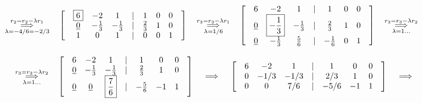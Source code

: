 \documentclass[fleqn]{article}
\begin{document}
\[
\overset{r_2=r_2-\lambda r_1}{\underset{\lambda=-4/6=-2/3}{\implies}} \hspace{0.321cm}
\begin{bmatrix}
& \boxed{6} & -2 & 1 & | & 1 & 0 & 0 & \\
& \underline{0} & -\frac{1}{3} & -\frac{1}{3} & | & \frac{2}{3} & 1 & 0 & \\
& 1 & 0 & 1 & | & 0 & 0 & 1 & 
\end{bmatrix}
\hspace{0.321cm} \overset{r_3=r_3-\lambda r_1}{\underset{\lambda=1/6}{\implies}} \hspace{0.321cm}
\begin{bmatrix}
& 6 & -2 & 1 & | & 1 & 0 & 0 & \\
& \underline{0} & \boxed{-\frac{1}{3}} & -\frac{1}{3} & | & \frac{2}{3} & 1 & 0 & \\
& \underline{0} & -\frac{1}{3} & \frac{5}{6} & | & -\frac{1}{6} & 0 & 1 & 
\end{bmatrix}
\hspace{0.321cm} \overset{r_3=r_3-\lambda r_2}{\underset{\lambda=1...}{\implies}} \hspace{0.321cm}
\]

\[
\hspace{0.321cm} \overset{r_3=r_3-\lambda r_2}{\underset{\lambda=1...}{\implies}} \hspace{0.321cm}
\begin{bmatrix}
& 6 & -2 & 1 & | & 1 & 0 & 0 & \\
& \underline{0} & -\frac{1}{3} & -\frac{1}{3} & | & \frac{2}{3} & 1 & 0 & \\
& \underline{0} & \underline{0} & \boxed{\frac{7}{6}} & | & -\frac{5}{6} & -1 & 1 & 
\end{bmatrix}
\hspace{0.321cm} \implies \hspace{0.321cm}
\begin{bmatrix}
& 6 & -2 & 1 & | & 1 & 0 & 0 & \\
& 0 & -1/3 & -1/3 & | & 2/3 & 1 & 0 & \\
& 0 & 0 & 7/6 & | & -5/6 & -1 & 1 & 
\end{bmatrix}
\hspace{0.321cm} \implies \hspace{0.321cm}
\]
\end{document}
